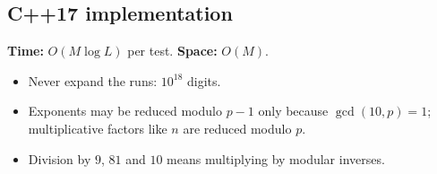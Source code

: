 
\subsection*{C++17 implementation}

\begin{complexitybox}
\textbf{Time:} $O(M\log L)$ per test. \textbf{Space:} $O(M)$.
\end{complexitybox}

\begin{pitfallbox}
\begin{itemize}
  \item Never expand the runs: $10^{18}$ digits.
  \item Exponents may be reduced modulo $p-1$ only because $\gcd(10,p)=1$;
        multiplicative factors like $n$ are reduced modulo $p$.
  \item Division by $9$, $81$ and $10$ means multiplying by modular
        inverses.
\end{itemize}
\end{pitfallbox}
